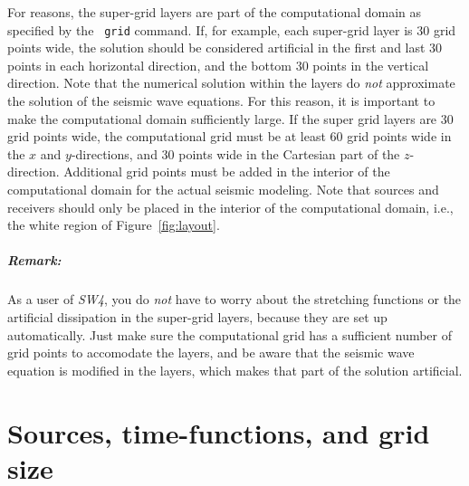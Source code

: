 \documentclass[11pt]{report}
\begin{document}
For reasons, the super-grid layers are part of the computational domain as specified by the {\tt
		grid} command. If, for example, each super-grid layer is 30 grid points wide, the solution should
be considered artificial in the first and last 30 points in each horizontal direction, and the
bottom 30 points in the vertical direction. Note that the numerical solution within the layers do
	{\em not} approximate the solution of the seismic wave equations. For this reason, it is important
to make the computational domain sufficiently large. If the super grid layers are 30 grid points
wide, the computational grid must be at least 60 grid points wide in the $x$ and $y$-directions, and
30 points wide in the Cartesian part of the $z$-direction. Additional grid points must be added in
the interior of the computational domain for the actual seismic modeling. Note that sources and
receivers should only be placed in the interior of the computational domain, i.e., the white region
of Figure~\ref{fig:layout}.

\paragraph{Remark:} As a user of \emph{SW4}, you do {\em not} have to worry about the
stretching functions or the artificial dissipation in the super-grid layers, because they are set up
automatically. Just make sure the computational grid has a sufficient number of grid points to
accomodate the layers, and be aware that the seismic wave equation is modified in the layers,
which makes that part of the solution artificial.

\chapter{Sources, time-functions, and grid size}

\end{document}
